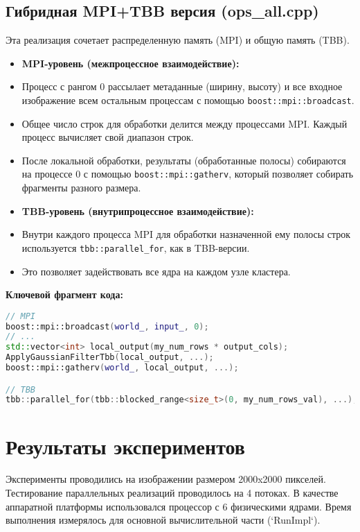 \documentclass[12pt,a4paper]{extarticle}
\begin{document}
\subsection{Гибридная MPI+TBB версия (ops\_all.cpp)}
Эта реализация сочетает распределенную память (MPI) и общую память (TBB).
\begin{itemize}
    \item \textbf{MPI-уровень (межпроцессное взаимодействие):}
        \item Процесс с рангом 0 рассылает метаданные (ширину, высоту) и все входное изображение всем остальным процессам с помощью \lstinline{boost::mpi::broadcast}.
        \item Общее число строк для обработки делится между процессами MPI. Каждый процесс вычисляет свой диапазон строк.
        \item После локальной обработки, результаты (обработанные полосы) собираются на процессе 0 с помощью \lstinline{boost::mpi::gatherv}, который позволяет собирать фрагменты разного размера.
    \item \textbf{TBB-уровень (внутрипроцессное взаимодействие):}
        \item Внутри каждого процесса MPI для обработки назначенной ему полосы строк используется \lstinline{tbb::parallel_for}, как в TBB-версии.
        \item Это позволяет задействовать все ядра на каждом узле кластера.
\end{itemize}
\textbf{Ключевой фрагмент кода:}
\begin{lstlisting}[language=C++]
// MPI
boost::mpi::broadcast(world_, input_, 0);
// ...
std::vector<int> local_output(my_num_rows * output_cols);
ApplyGaussianFilterTbb(local_output, ...);
boost::mpi::gatherv(world_, local_output, ...);

// TBB
tbb::parallel_for(tbb::blocked_range<size_t>(0, my_num_rows_val), ...);
\end{lstlisting}

\newpage
\section{Результаты экспериментов}
Эксперименты проводились на изображении размером 2000x2000 пикселей. Тестирование параллельных реализаций проводилось на 4 потоках. В качестве аппаратной платформы использовался процессор с 6 физическими ядрами. Время выполнения измерялось для основной вычислительной части (`RunImpl`).
\end{document}
